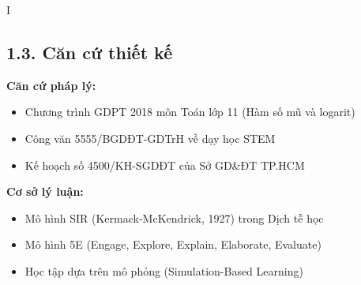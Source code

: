 \documentclass[12pt,a4paper]{article}
\begin{document}
\begin{competitionsection}{I}
\subsection*{1.3. Căn cứ thiết kế}
\begin{minipage}{0.48\textwidth}
\textbf{Căn cứ pháp lý:}
\begin{itemize}[leftmargin=*,noitemsep]
\item Chương trình GDPT 2018 môn Toán lớp 11 (Hàm số mũ và logarit)
\item Công văn 5555/BGDĐT-GDTrH về dạy học STEM
\item Kế hoạch số 4500/KH-SGDĐT của Sở GD\&ĐT TP.HCM
\end{itemize}
\end{minipage}
\hfill
\begin{minipage}{0.48\textwidth}
\textbf{Cơ sở lý luận:}
\begin{itemize}[leftmargin=*,noitemsep]
\item Mô hình SIR (Kermack-McKendrick, 1927) trong Dịch tễ học
\item Mô hình 5E (Engage, Explore, Explain, Elaborate, Evaluate)
\item Học tập dựa trên mô phỏng (Simulation-Based Learning)
\end{itemize}
\end{minipage}


\end{competitionsection}
\end{document}
